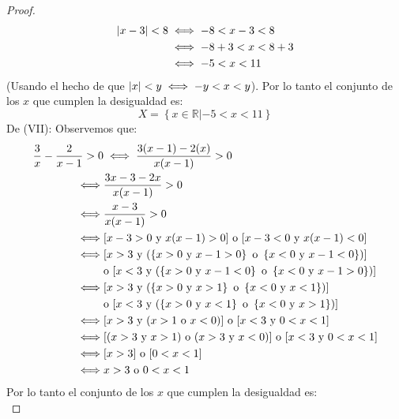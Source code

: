 \documentclass[12pt]{article}
\begin{document}
\begin{enumerate}
\begin{proof}
\begin{equation*}
            \begin{split}
                \left| x-3 \right|<8&\iff -8<x-3<8\\
                &\iff -8+3<x<8+3\\
                &\iff -5<x<11
            \end{split}
        \end{equation*}
        (Usando el hecho de que $\left| x \right|<y\iff -y<x<y$). Por lo tanto el conjunto de los $x$ que cumplen la desigualdad es:
        \begin{equation*}
            X = \left\{x\in\mathbb{R}|-5<x<11\right\}
        \end{equation*}
        De (VII): Observemos que:
        \begin{equation*}
            \begin{split}
                \frac{3}{x}-\frac{2}{x-1}>0&\iff\frac{3(x-1)-2(x)}{x(x-1)}>0\\
                \iff&\frac{3x-3-2x}{x(x-1)}>0\\
                \iff&\frac{x-3}{x(x-1)}>0 \\
                \iff&[x-3>0 \textup{ y }x(x-1)>0]\textup{ o }[x-3<0 \textup{ y }x(x-1)<0]\\
                \iff&[x>3 \textup{ y }(\left\{x>0\textup{ y }x-1>0\right\}\textup{ o }\left\{x<0\textup{ y }x-1<0\right\})]\\
                &\textup{o }[x<3 \textup{ y }(\left\{x>0\textup{ y }x-1<0\right\}\textup{ o }\left\{x<0\textup{ y }x-1>0\right\})]\\
                \iff&[x>3 \textup{ y }(\left\{x>0\textup{ y }x>1\right\}\textup{ o }\left\{x<0\textup{ y }x<1\right\})]\\
                &\textup{o }[x<3 \textup{ y }(\left\{x>0\textup{ y }x<1\right\}\textup{ o }\left\{x<0\textup{ y }x>1\right\})]\\
                \iff&[x>3 \textup{ y }(x>1\textup{ o }x<0)]\textup{ o }[x<3 \textup{ y }0<x<1]\\
                \iff&[(x>3\textup{ y }x>1)\textup{ o }(x>3\textup{ y }x<0)]\textup{ o }[x<3 \textup{ y }0<x<1]\\
                \iff&[x>3]\textup{ o }[0<x<1]\\
                \iff&x>3\textup{ o }0<x<1
            \end{split}
        \end{equation*}
        Por lo tanto el conjunto de los $x$ que cumplen la desigualdad es:
        \begin{equation*}

\end{equation*}
\end{proof}
\end{enumerate}
\end{document}
